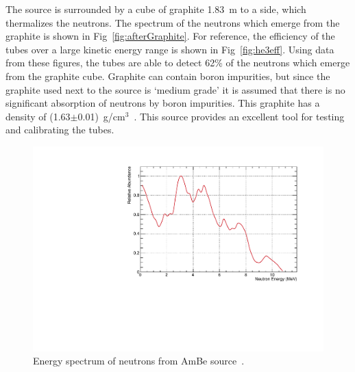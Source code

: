 The source is surrounded by a cube of graphite 1.83~m to a side, which thermalizes the neutrons. The spectrum of the neutrons which emerge from the graphite is shown in Fig~\ref{fig:afterGraphite}. For reference, the efficiency of the \he tubes over a large kinetic energy range is shown in Fig~\ref{fig:he3eff}. Using data from these figures, the \he tubes are able to detect 62\% of the neutrons which emerge from the graphite cube. Graphite can contain boron impurities, but since the graphite used next to the source is `medium grade' it is assumed that there is no significant absorption of neutrons by boron impurities. This graphite has a density of (1.63$\pm$0.01)~g/cm$^3$~\cite{AmBELetter}. This source provides an excellent tool for testing and calibrating the \he tubes. 

\begin{figure}
	\centerfloat
		\includegraphics[trim={0 0 0 0.75cm},clip, width=\textwidth]{images/AmBe_NeutronSpectrum.pdf}
	\caption[Energy spectrum of neutrons from AmBe source]{Energy spectrum of neutrons from AmBe source~\cite{AmBeSpec}.}
	\label{fig:AmBeSpec}
\end{figure}


